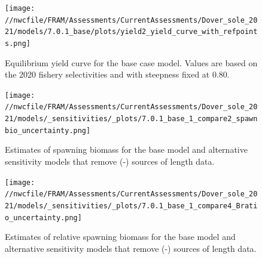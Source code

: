 \documentclass[11pt,
  english,
  a4paper,
]{article}
\begin{document}
\tagmcend\tagstructend


\begin{figure}
\centering
\texttt{[image: //nwcfile/FRAM/Assessments/CurrentAssessments/Dover\_sole\_2021/models/7.0.1\_base/plots/yield2\_yield\_curve\_with\_refpoints.png]}
\caption{Equilibrium yield curve for the base case model. Values are based on the 2020 fishery selectivities and with steepness fixed at 0.80.\label{fig:yield}}
\end{figure}

\tagmcend\tagstructend


\begin{figure}
\centering
\texttt{[image: //nwcfile/FRAM/Assessments/CurrentAssessments/Dover\_sole\_2021/models/\_sensitivities/\_plots/7.0.1\_base\_1\_compare2\_spawnbio\_uncertainty.png]}
\caption{Estimates of spawning biomass for the base model and alternative sensitivity models that remove (-) sources of length data.\label{fig:sens-length-ssb}}
\end{figure}

\tagmcend\tagstructend


\begin{figure}
\centering
\texttt{[image: //nwcfile/FRAM/Assessments/CurrentAssessments/Dover\_sole\_2021/models/\_sensitivities/\_plots/7.0.1\_base\_1\_compare4\_Bratio\_uncertainty.png]}
\caption{Estimates of relative spawning biomass for the base model and alternative sensitivity models that remove (-) sources of length data.\label{fig:sens-length-relssb}}
\end{figure}

\tagmcend\tagstructend

\end{document}
